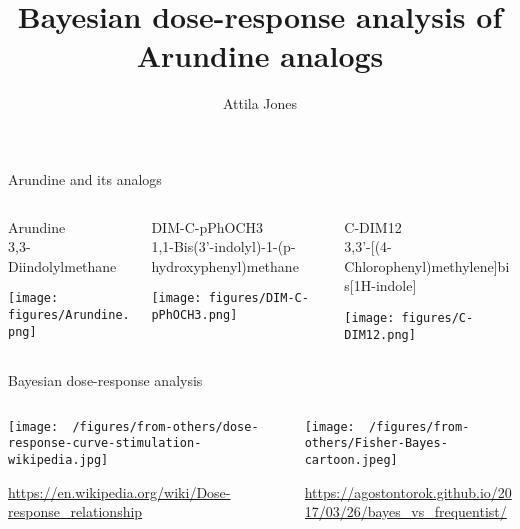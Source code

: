 \documentclass[aspectratio=169]{beamer}
\title{Bayesian dose-response analysis of Arundine analogs}
\subtitle{}
\author{Attila Jones}
\date{}
\begin{document}
\titlepage

\begin{frame}{Arundine and its analogs}
\begin{columns}[t]
\begin{column}{0.33\textwidth}
\begin{center}
  Arundine\\
  \footnotesize{3,3-Diindolylmethane}

  \texttt{[image: figures/Arundine.png]}
\end{center}
\end{column}

\begin{column}{0.33\textwidth}
\begin{center}
  DIM-C-pPhOCH3\\
  \footnotesize{1,1-Bis(3'-indolyl)-1-(p-hydroxyphenyl)methane}

  \texttt{[image: figures/DIM-C-pPhOCH3.png]}
\end{center}
\end{column}

\begin{column}{0.33\textwidth}
\begin{center}
  C-DIM12\\
  \footnotesize{3,3'-[(4-Chlorophenyl)methylene]bis[1H-indole]}

  \texttt{[image: figures/C-DIM12.png]}
\end{center}
\end{column}
\end{columns}
\end{frame}

\begin{frame}{Bayesian dose-response analysis}
\begin{columns}[t]
\begin{column}{0.5\textwidth}

\texttt{[image: ~/figures/from-others/dose-response-curve-stimulation-wikipedia.jpg]}

\tiny{\url{https://en.wikipedia.org/wiki/Dose-response\_relationship}}
\end{column}

\begin{column}{0.5\textwidth}

\texttt{[image: ~/figures/from-others/Fisher-Bayes-cartoon.jpeg]}

\tiny{\url{https://agostontorok.github.io/2017/03/26/bayes_vs_frequentist/}}
\end{column}
\end{columns}
\end{frame}
\end{document}
